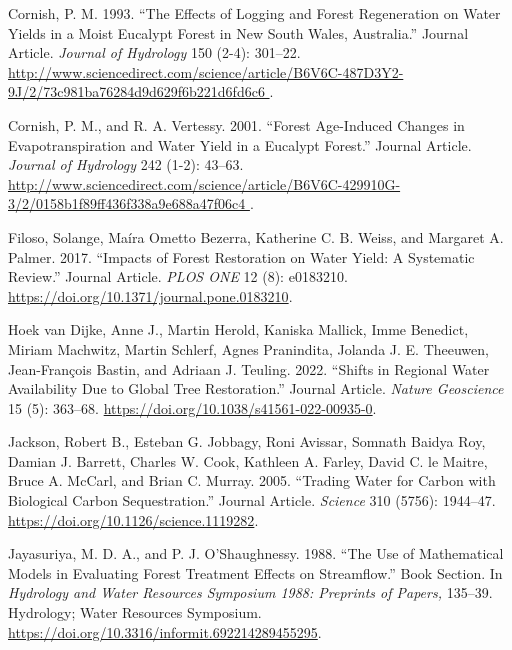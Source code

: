 \documentclass[]{elsarticle} %
\newlength{\cslhangindent}
\newlength{\cslentryspacingunit} %
\newenvironment{CSLReferences}[2] %
 {%
  \setlength{\parindent}{0pt}
  \ifodd #1
  \let\oldpar\par
  \def\par{\hangindent=\cslhangindent\oldpar}
  \fi
  \setlength{\parskip}{#2\cslentryspacingunit}
 }%
 {}
\begin{document}
\hypertarget{refs}{}
\begin{CSLReferences}{1}{0}
\leavevmode{}%
Cornish, P. M. 1993. {``The Effects of Logging and Forest Regeneration on Water Yields in a Moist Eucalypt Forest in New South Wales, Australia.''} Journal Article. \emph{Journal of Hydrology} 150 (2-4): 301--22. \href{http://www.sciencedirect.com/science/article/B6V6C-487D3Y2-9J/2/73c981ba76284d9d629f6b221d6fd6c6\%20}{http://www.sciencedirect.com/science/article/B6V6C-487D3Y2-9J/2/73c981ba76284d9d629f6b221d6fd6c6 }.

\leavevmode{}%
Cornish, P. M., and R. A. Vertessy. 2001. {``Forest Age-Induced Changes in Evapotranspiration and Water Yield in a Eucalypt Forest.''} Journal Article. \emph{Journal of Hydrology} 242 (1-2): 43--63. \href{http://www.sciencedirect.com/science/article/B6V6C-429910G-3/2/0158b1f89ff436f338a9e688a47f06c4\%20}{http://www.sciencedirect.com/science/article/B6V6C-429910G-3/2/0158b1f89ff436f338a9e688a47f06c4 }.

\leavevmode{}%
Filoso, Solange, Maíra Ometto Bezerra, Katherine C. B. Weiss, and Margaret A. Palmer. 2017. {``Impacts of Forest Restoration on Water Yield: A Systematic Review.''} Journal Article. \emph{PLOS ONE} 12 (8): e0183210. \url{https://doi.org/10.1371/journal.pone.0183210}.

\leavevmode{}%
Hoek van Dijke, Anne J., Martin Herold, Kaniska Mallick, Imme Benedict, Miriam Machwitz, Martin Schlerf, Agnes Pranindita, Jolanda J. E. Theeuwen, Jean-François Bastin, and Adriaan J. Teuling. 2022. {``Shifts in Regional Water Availability Due to Global Tree Restoration.''} Journal Article. \emph{Nature Geoscience} 15 (5): 363--68. \url{https://doi.org/10.1038/s41561-022-00935-0}.

\leavevmode{}%
Jackson, Robert B., Esteban G. Jobbagy, Roni Avissar, Somnath Baidya Roy, Damian J. Barrett, Charles W. Cook, Kathleen A. Farley, David C. le Maitre, Bruce A. McCarl, and Brian C. Murray. 2005. {``Trading Water for Carbon with Biological Carbon Sequestration.''} Journal Article. \emph{Science} 310 (5756): 1944--47. \url{https://doi.org/10.1126/science.1119282}.

\leavevmode{}%
Jayasuriya, M. D. A., and P. J. O'Shaughnessy. 1988. {``The Use of Mathematical Models in Evaluating Forest Treatment Effects on Streamflow.''} Book Section. In \emph{Hydrology and Water Resources Symposium 1988: Preprints of Papers,} 135--39. Hydrology; Water Resources Symposium. \url{https://doi.org/10.3316/informit.692214289455295}.


\end{CSLReferences}
\end{document}
